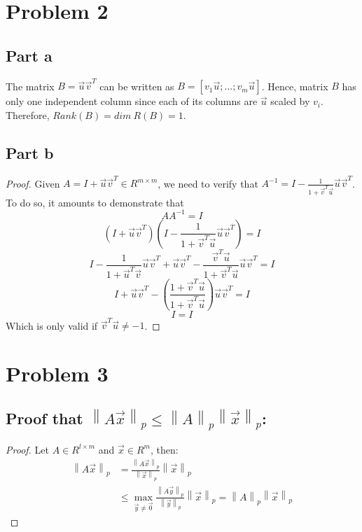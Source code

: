 \documentclass[10pt]{article}
\newcommand{\norm}[1]{\left\lVert#1\right\rVert_p}
\begin{document}
\section{Problem 2}

\subsection{Part a}
The matrix $B = \vec{u}\vec{v}^T$ can be written as 
$B = [v_1\vec{u};...;v_m\vec{u}]$. Hence, matrix $B$ has only one independent
column since each of its columns are $\vec{u}$ scaled by $v_i$. Therefore, 
$Rank(B) = dim \ R(B) = 1$.

\subsection{Part b}
\begin{proof}
Given $A = I+\vec{u}\vec{v}^T \in R^{m\times m}$, we need to verify that 
$A^{-1} = I - \frac{1}{1+\vec{v}^T\vec{u}}\vec{u}\vec{v}^T$. To do so, it
amounts to demonstrate that 
\[
 A A^{-1} = I
\] 
\[
 \left(I+\vec{u}\vec{v}^T \right)\left( I - \frac{1}{1+\vec{v}^T\vec{u}}\vec{u}\vec{v}^T\right) =I
\]
\[
I - \frac{1}{1+\vec{u}^T\vec{v}}\vec{u}\vec{v}^T +\vec{u}\vec{v}^T -\frac{\vec{v}^T\vec{u}}{1+\vec{v}^T\vec{u}}\vec{u}\vec{v}^T = I
\]
\[
 I + \vec{u}\vec{v}^T  - \left( \frac{1+\vec{v}^T\vec{u}}{1+\vec{v}^T\vec{u}} \right)\vec{u}\vec{v}^T = I 
\]
\[
 I = I
\]
Which is only valid if $\vec{v}^T\vec{u} \neq -1$.
\end{proof}

\section{Problem 3}
\subsection{Proof that $\norm{A\vec{x}} \leq \norm{A}\norm{\vec{x}}$:}
\begin{proof}
  Let $A \in R^{l\times m}$ and $\vec{x} \in R^m$, then:
    \begin{align*}
    \norm{A\vec{x}} &= \frac{\norm{A\vec{x}}}{\norm{\vec{x}}} \norm{\vec{x}} \\
                    &\leq \max_{\vec{y}\neq \vec{0}}\frac{\norm{A\vec{y}}}{\norm{\vec{y}}} \norm{\vec{x}}  = \norm{A}\norm{\vec{x}}
  \end{align*}
\end{proof}
\end{document}
